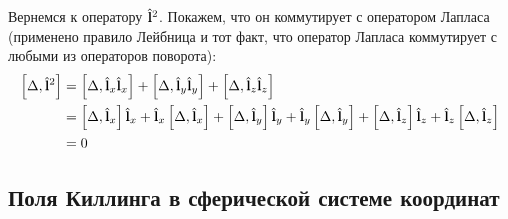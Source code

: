 \documentclass[12pt,a4paper]{article}
\begin{document}
            Вернемся к оператору $\hat{\mathbf{l}}^2$. Покажем, что он коммутирует с оператором Лапласа (применено правило Лейбница и тот факт, что оператор Лапласа коммутирует с любыми из операторов поворота):
            \begin{equation}\begin{aligned}
                \left[ \Delta, \hat{\mathbf{l}}^2 \right]
                    &= \left[ \Delta, \hat{\mathbf{l}}_x \hat{\mathbf{l}}_x \right]
                        + \left[ \Delta, \hat{\mathbf{l}}_y \hat{\mathbf{l}}_y \right]
                        + \left[ \Delta, \hat{\mathbf{l}}_z \hat{\mathbf{l}}_z \right] \\
                    &= \left[ \Delta, \hat{\mathbf{l}}_x \right] \hat{\mathbf{l}}_x
                        + \hat{\mathbf{l}}_x \left[ \Delta, \hat{\mathbf{l}}_x \right]
                        + \left[ \Delta, \hat{\mathbf{l}}_y \right] \hat{\mathbf{l}}_y
                        + \hat{\mathbf{l}}_y \left[ \Delta, \hat{\mathbf{l}}_y \right]
                        + \left[ \Delta, \hat{\mathbf{l}}_z \right] \hat{\mathbf{l}}_z
                        + \hat{\mathbf{l}}_z \left[ \Delta, \hat{\mathbf{l}}_z \right] \\
                    &= 0
            \end{aligned}\end{equation}


        \subsection{Поля Киллинга в сферической системе координат}
\end{document}
